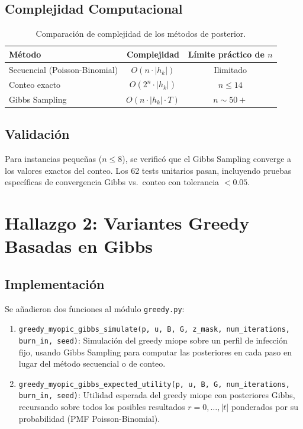 \documentclass[11pt, a4paper]{article}
\begin{document}
\subsection{Complejidad Computacional}
\begin{table}[htbp]
\centering
\caption{Comparaci\'on de complejidad de los m\'etodos de posterior.}
\begin{tabular}{lcc}
\toprule
\textbf{M\'etodo} & \textbf{Complejidad} & \textbf{L\'imite pr\'actico de $n$} \\
\midrule
Secuencial (Poisson-Binomial) & $O(n \cdot |h_k|)$ & Ilimitado \\
Conteo exacto & $O(2^n \cdot |h_k|)$ & $n \leq 14$ \\
Gibbs Sampling & $O(n \cdot |h_k| \cdot T)$ & $n \sim 50+$ \\
\bottomrule
\end{tabular}
\end{table}

\subsection{Validaci\'on}
Para instancias peque\~nas ($n \leq 8$), se verific\'o que el Gibbs Sampling
converge a los valores exactos del conteo. Los 62 tests unitarios pasan,
incluyendo pruebas espec\'ificas de convergencia Gibbs vs.\ conteo con
tolerancia $< 0.05$.

\section{Hallazgo 2: Variantes Greedy Basadas en Gibbs}

\subsection{Implementaci\'on}
Se a\~nadieron dos funciones al m\'odulo \texttt{greedy.py}:

\begin{enumerate}[nosep]
    \item \texttt{greedy\_myopic\_gibbs\_simulate(p, u, B, G, z\_mask,
    num\_iterations, burn\_in, seed)}:
    Simulaci\'on del greedy miope sobre un perfil de infecci\'on fijo,
    usando Gibbs Sampling para computar las posteriores en cada paso en
    lugar del m\'etodo secuencial o de conteo.

    \item \texttt{greedy\_myopic\_gibbs\_expected\_utility(p, u, B, G,
    num\_iterations, burn\_in, seed)}:
    Utilidad esperada del greedy miope con posteriores Gibbs,
    recursando sobre todos los posibles resultados $r = 0, \ldots, |t|$
    ponderados por su probabilidad (PMF Poisson-Binomial).
\end{enumerate}
\end{document}
